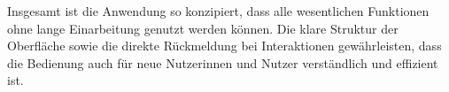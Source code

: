 \noindent
Insgesamt ist die Anwendung so konzipiert, dass alle wesentlichen Funktionen ohne lange Einarbeitung genutzt werden können.  
Die klare Struktur der Oberfläche sowie die direkte Rückmeldung bei Interaktionen gewährleisten, dass die Bedienung auch für neue Nutzerinnen
und Nutzer verständlich und effizient ist.
